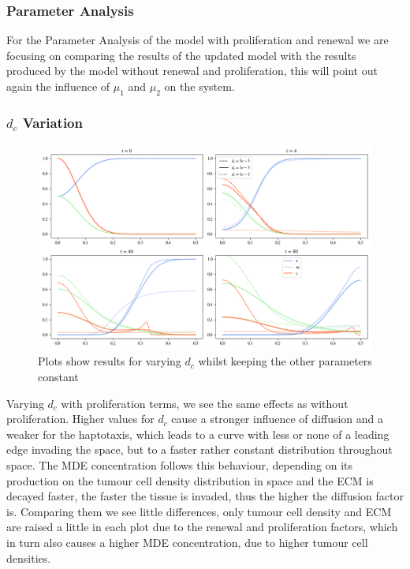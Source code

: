 \subsubsection{Parameter Analysis}

For the Parameter Analysis of the model with proliferation and renewal we are focusing on comparing the results of the updated model with the results produced by the model without renewal and proliferation, this will point out again the influence of $\mu_1$ and $\mu_2$ on the system. 

\subsubsection*{$d_c$ Variation}
\begin{figure}[h]
    \centering
    \includegraphics[width=\textwidth]{resources/images/prolif_dc_variation.png}
    \caption{Plots show results for varying $d_c$ whilst keeping the other parameters constant}
    \label{fig:prolif_dc_comparison}
\end{figure}

Varying $d_c$ with proliferation terms, we see the same effects as without proliferation. Higher values for $d_c$ cause a stronger influence of diffusion and a weaker for the haptotaxis, which leads to a curve with less or none of a leading edge invading the space, but to a faster rather constant distribution throughout space. The MDE concentration follows this behaviour, depending on its production on the tumour cell density distribution in space and the ECM is decayed faster, the faster the tissue is invaded, thus the higher the diffusion factor is. Comparing them we see little differences, only tumour cell density and ECM are raised a little in each plot due to the renewal and proliferation factors, which in turn also causes a higher MDE concentration, due to higher tumour cell densities. 


